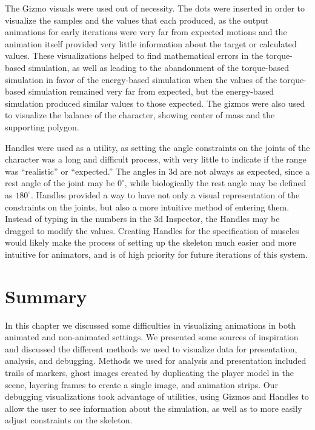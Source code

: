 The Gizmo visuals were used out of necessity.  The dots were inserted in order to visualize the samples and the values that each produced, as the output animations for early iterations were very far from expected motions and the animation itself provided very little information about the target or calculated values.  These visualizations helped to find mathematical errors in the torque-based simulation, as well as leading to the abandonment of the torque-based simulation in favor of the energy-based simulation when the values of the torque-based simulation remained very far from expected, but the energy-based simulation produced similar values to those expected.  The gizmos were also used to visualize the balance of the character, showing center of mass and the supporting polygon.

Handles were used as a utility, as setting the angle constraints on the joints of the character was a long and difficult process, with very little to indicate if the range was ``realistic'' or ``expected.'' The angles in \unity3d{} are not always as expected, since a rest angle of the joint may be $0^\circ$, while biologically the rest angle may be defined as $180^\circ$.  Handles provided a way to have not only a visual representation of the constraints on the joints, but also a more intuitive method of entering them.  Instead of typing in the numbers in the \unity3d{} Inspector, the Handles may be dragged to modify the values.  Creating Handles for the specification of muscles would likely make the process of setting up the skeleton much easier and more intuitive for animators, and is of high priority for future iterations of this system.

\section{Summary}
In this chapter we discussed some difficulties in visualizing animations in both animated and non-animated settings.  We presented some sources of inspiration and discussed the different methods we used to visualize data for presentation, analysis, and debugging.  Methods we used for analysis and presentation included trails of markers, ghost images created by duplicating the player model in the scene, layering frames to create a single image, and animation strips.  Our debugging visualizations took advantage of \unity{} utilities, using Gizmos and Handles to allow the user to see information about the simulation, as well as to more easily adjust constraints on the skeleton.
\label{section:vis_summary}
